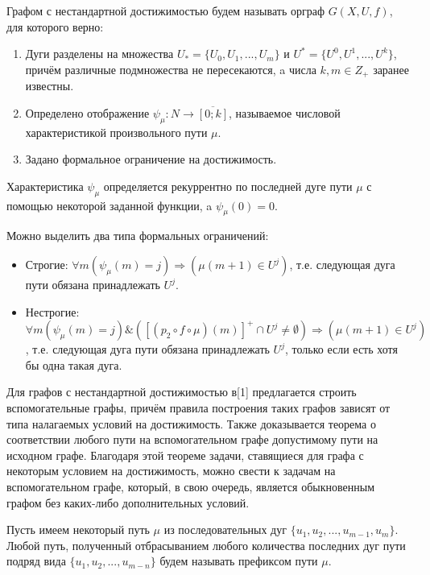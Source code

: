 \begin{definition}
	Графом с нестандартной достижимостью будем называть орграф $G(X,U,f)$, для которого верно:
	\begin{enumerate}
		\item Дуги разделены на множества $U_* = \{U_0, U_1, ... , U_m\}$ и $U^* = \{U^0, U^1, ... , U^k\}$, причём различные подмножества не пересекаются, a числа $k, m \in Z_+$ заранее известны.
		\item Определено отображение $\psi_\mu:N\to \overline{ [0; k] }$, называемое числовой характеристикой произвольного пути $\mu$.
		\item Задано формальное ограничение на достижимость.
	\end{enumerate}
\end{definition}

Характеристика $\psi_\mu$ определяется рекуррентно по последней дуге пути $\mu$ с помощью некоторой заданной функции, a $\psi_\mu(0) = 0$.

Можно выделить два типа формальных ограничений:
\begin{itemize}
	\item Строгие: $\forall m (\psi_\mu(m) = j) \Longrightarrow (\mu(m+1) \in U^j) $, т.е. следующая дуга пути обязана принадлежать $U^j$.
	\item Нестрогие: $\forall m (\psi_\mu(m) = j) \& ([(p_2 \circ f \circ \mu)(m)]^+ \cap U^j \neq \emptyset) \Longrightarrow (\mu(m+1) \in U^j) $, т.е. следующая дуга пути обязана принадлежать $U^j$, только если есть хотя бы одна такая дуга.
\end{itemize}

Для графов с нестандартной достижимостью в[1] предлагается строить вспомогательные графы, причём правила построения таких графов зависят от типа налагаемых условий на достижимость. Также доказывается теорема о соответствии любого пути на вспомогательном графе допустимому пути на исходном графе. Благодаря этой теореме задачи, ставящиеся для графа с некоторым условием на достижимость, можно свести к задачам на вспомогательном графе, который, в свою очередь, является обыкновенным графом без каких-либо дополнительных условий. 

\begin{definition}
	Пусть имеем некоторый путь $\mu$ из последовательных дуг $\{u_1, u_2, ... , u_{m-1}, u_m\}$. Любой путь, полученный отбрасыванием любого количества последних дуг пути подряд вида $\{u_1, u_2, ... , u_{m-n} \}$ будем называть префиксом пути $\mu$.
\end{definition}

